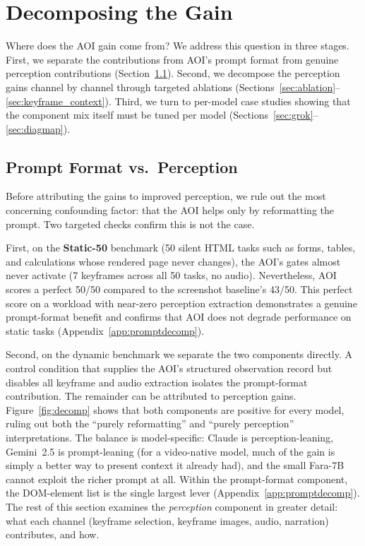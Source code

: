 \documentclass[11pt]{article}
\begin{document}
\section{Decomposing the Gain}
\label{sec:static}

Where does the AOI gain come from?
We address this question in three stages. First, we separate the contributions from AOI's prompt format from genuine perception contributions (Section~\ref{sec:promptperc}). Second, we decompose the perception gains channel by channel through targeted ablations (Sections~\ref{sec:ablation}--\ref{sec:keyframe_context}). Third, we turn to per-model case studies showing that the component mix itself must be tuned per model (Sections~\ref{sec:grok}--\ref{sec:diagmap}).

\subsection{Prompt Format vs.\ Perception}
\label{sec:promptperc}

Before attributing the gains to improved perception, we rule out the most concerning
confounding factor: that the AOI helps only by reformatting the prompt.
Two targeted checks confirm this is not the case.



First, on the \textbf{Static-50} benchmark (50 silent HTML tasks such as forms, tables,
and calculations whose rendered page never changes), the AOI's gates almost
never activate (7 keyframes across all 50 tasks, no audio). Nevertheless, AOI scores a perfect 50/50 compared to the screenshot baseline's 43/50.
This perfect score on a workload with near-zero perception extraction demonstrates a
genuine prompt-format benefit and confirms that AOI does not degrade performance on static tasks (Appendix~\ref{app:promptdecomp}).

Second, on the dynamic benchmark we separate the two components directly. A
control condition that supplies the AOI's structured observation record but disables all
keyframe and audio extraction isolates the prompt-format contribution. The remainder
can be attributed to perception gains.
Figure~\ref{fig:decomp} shows that both components are positive for every model, ruling out both the ``purely reformatting'' and ``purely perception'' interpretations.
The balance is model-specific: Claude is perception-leaning, Gemini~2.5 is
prompt-leaning (for a video-native model, much of the gain is simply a better way
to present context it already had), and the small Fara-7B cannot exploit the
richer prompt at all.
Within the prompt-format component, the DOM-element list is the single largest lever
(Appendix~\ref{app:promptdecomp}).
The rest of this section examines the \emph{perception} component in greater detail: what each
channel (keyframe selection, keyframe images, audio, narration) contributes, and
how.
\end{document}
